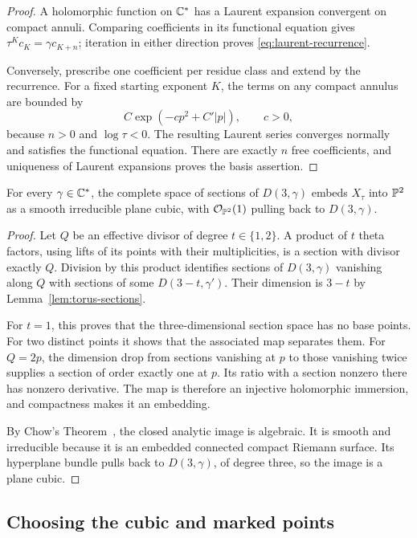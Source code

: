 \begin{proof}
A holomorphic function on $\mathbb C^*$ has a Laurent expansion convergent
on compact annuli. Comparing coefficients in its functional equation
gives $\tau^Kc_K=\gamma c_{K+n}$; iteration in either direction
proves \eqref{eq:laurent-recurrence}.

Conversely, prescribe one coefficient per residue class and extend
by the recurrence. For a fixed starting exponent $K$, the terms on
any compact annulus are bounded by
\[
 C\exp(-c p^2+C'|p|),\qquad c>0,
\]
because $n>0$ and $\log\tau<0$. The resulting Laurent series
converges normally and satisfies the functional equation. There are
exactly $n$ free coefficients, and uniqueness of Laurent expansions
proves the basis assertion.
\end{proof}

\begin{lemma}
\label{lem:cubic-embedding}
For every $\gamma\in\mathbb C^*$, the complete space of sections of
$D(3,\gamma)$ embeds $X_\tau$ into $\mathbb P^2$ as a smooth irreducible
plane cubic, with $\mathcal O_{\mathbb P^2}(1)$ pulling back to
$D(3,\gamma)$.
\end{lemma}

\begin{proof}
Let $Q$ be an effective divisor of degree $t\in\{1,2\}$. A product
of $t$ theta factors, using lifts of its points with their
multiplicities, is a section with divisor exactly $Q$. Division by
this product identifies sections of $D(3,\gamma)$ vanishing along
$Q$ with sections of some $D(3-t,\gamma')$. Their dimension is
$3-t$ by Lemma~\ref{lem:torus-sections}.

For $t=1$, this proves that the three-dimensional section space has
no base points. For two distinct points it shows that the associated
map separates them. For $Q=2p$, the dimension drop from sections
vanishing at $p$ to those vanishing twice supplies a section of order
exactly one at $p$. Its ratio with a section nonzero there has nonzero
derivative. The map is therefore an injective holomorphic immersion,
and compactness makes it an embedding.

By Chow's Theorem~\cite{Chow1949}, the closed analytic image is
algebraic. It is smooth and irreducible because it is an embedded
connected compact Riemann surface. Its hyperplane bundle pulls back
to $D(3,\gamma)$, of degree three, so the image is a plane cubic.
\end{proof}

\subsection{Choosing the cubic and marked points}


